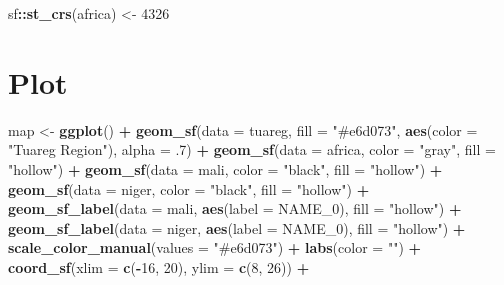 \documentclass[
]{article}
\newenvironment{Shaded}{\begin{snugshade}}{\end{snugshade}}
\newcommand{\DataTypeTok}[1]{\textcolor[rgb]{0.13,0.29,0.53}{#1}}
\newcommand{\DecValTok}[1]{\textcolor[rgb]{0.00,0.00,0.81}{#1}}
\newcommand{\FloatTok}[1]{\textcolor[rgb]{0.00,0.00,0.81}{#1}}
\newcommand{\KeywordTok}[1]{\textcolor[rgb]{0.13,0.29,0.53}{\textbf{#1}}}
\newcommand{\NormalTok}[1]{#1}
\newcommand{\OperatorTok}[1]{\textcolor[rgb]{0.81,0.36,0.00}{\textbf{#1}}}
\newcommand{\StringTok}[1]{\textcolor[rgb]{0.31,0.60,0.02}{#1}}
\begin{document}
\begin{Shaded}
\begin{Highlighting}[]
\NormalTok{sf}\OperatorTok{::}\KeywordTok{st_crs}\NormalTok{(africa) <-}\StringTok{ }\DecValTok{4326}
\end{Highlighting}
\end{Shaded}

\hypertarget{plot}{%
\section{Plot}\label{plot}}

\begin{Shaded}
\begin{Highlighting}[]
\NormalTok{map <-}\StringTok{ }\KeywordTok{ggplot}\NormalTok{() }\OperatorTok{+}
\StringTok{  }\KeywordTok{geom_sf}\NormalTok{(}\DataTypeTok{data =}\NormalTok{ tuareg, }\DataTypeTok{fill =} \StringTok{"#e6d073"}\NormalTok{, }\KeywordTok{aes}\NormalTok{(}\DataTypeTok{color =} \StringTok{"Tuareg Region"}\NormalTok{), }\DataTypeTok{alpha =} \FloatTok{.7}\NormalTok{) }\OperatorTok{+}
\StringTok{  }\KeywordTok{geom_sf}\NormalTok{(}\DataTypeTok{data =}\NormalTok{ africa, }\DataTypeTok{color =} \StringTok{"gray"}\NormalTok{, }\DataTypeTok{fill =} \StringTok{"hollow"}\NormalTok{) }\OperatorTok{+}
\StringTok{  }\KeywordTok{geom_sf}\NormalTok{(}\DataTypeTok{data =}\NormalTok{ mali, }\DataTypeTok{color =} \StringTok{"black"}\NormalTok{, }\DataTypeTok{fill =} \StringTok{"hollow"}\NormalTok{) }\OperatorTok{+}
\StringTok{  }\KeywordTok{geom_sf}\NormalTok{(}\DataTypeTok{data =}\NormalTok{ niger, }\DataTypeTok{color =} \StringTok{"black"}\NormalTok{, }\DataTypeTok{fill =} \StringTok{"hollow"}\NormalTok{) }\OperatorTok{+}
\StringTok{  }\KeywordTok{geom_sf_label}\NormalTok{(}\DataTypeTok{data =}\NormalTok{ mali, }\KeywordTok{aes}\NormalTok{(}\DataTypeTok{label =}\NormalTok{ NAME_}\DecValTok{0}\NormalTok{), }\DataTypeTok{fill =} \StringTok{"hollow"}\NormalTok{) }\OperatorTok{+}
\StringTok{  }\KeywordTok{geom_sf_label}\NormalTok{(}\DataTypeTok{data =}\NormalTok{ niger, }\KeywordTok{aes}\NormalTok{(}\DataTypeTok{label =}\NormalTok{ NAME_}\DecValTok{0}\NormalTok{), }\DataTypeTok{fill =} \StringTok{"hollow"}\NormalTok{) }\OperatorTok{+}
\StringTok{  }\KeywordTok{scale_color_manual}\NormalTok{(}\DataTypeTok{values =} \StringTok{"#e6d073"}\NormalTok{) }\OperatorTok{+}
\StringTok{  }\KeywordTok{labs}\NormalTok{(}\DataTypeTok{color =} \StringTok{""}\NormalTok{) }\OperatorTok{+}
\StringTok{  }\KeywordTok{coord_sf}\NormalTok{(}\DataTypeTok{xlim =} \KeywordTok{c}\NormalTok{(}\OperatorTok{-}\DecValTok{16}\NormalTok{, }\DecValTok{20}\NormalTok{), }\DataTypeTok{ylim =} \KeywordTok{c}\NormalTok{(}\DecValTok{8}\NormalTok{, }\DecValTok{26}\NormalTok{)) }\OperatorTok{+}

\end{Highlighting}
\end{Shaded}
\end{document}
